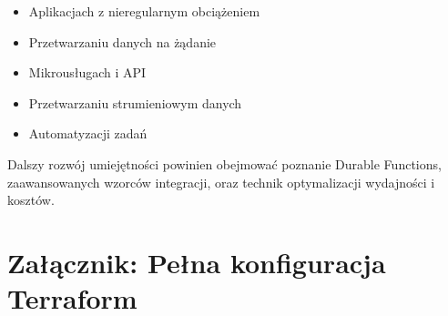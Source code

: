 \documentclass{article}
\begin{document}
\begin{itemize}
\item Aplikacjach z nieregularnym obciążeniem
\item Przetwarzaniu danych na żądanie
\item Mikrousługach i API
\item Przetwarzaniu strumieniowym danych
\item Automatyzacji zadań
\end{itemize}

Dalszy rozwój umiejętności powinien obejmować poznanie Durable Functions, zaawansowanych wzorców integracji, oraz technik optymalizacji wydajności i kosztów.

\section*{Załącznik: Pełna konfiguracja Terraform}
\end{document}
